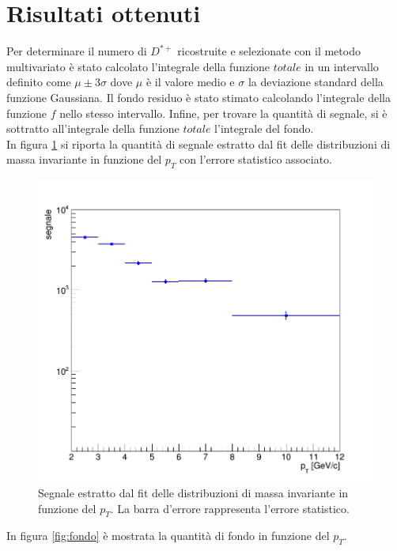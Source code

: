 \section{Risultati ottenuti}

Per determinare il numero di $D^{*+}$ ricostruite e selezionate con il metodo multivariato \`e stato calcolato l'integrale della funzione $totale$  in un intervallo definito come $\mu \pm 3 \sigma$ dove $\mu$  \`e il valore medio e $\sigma$ la deviazione standard della funzione Gaussiana. Il fondo residuo \`e stato stimato calcolando l'integrale della funzione $f$ nello stesso intervallo. Infine, per trovare la quantità di segnale, si è sottratto all'integrale della funzione $totale$ l'integrale del fondo. 
\\In figura \ref{fig:segnale} si riporta la quantità di segnale estratto dal fit delle distribuzioni di massa invariante in funzione del $p_T$ con l'errore statistico associato.

    \begin{figure}[htbp] 
        \centering
        \includegraphics[width=0.8\linewidth]{AnalisiDati/segnale.png}
        \caption{Segnale estratto dal fit delle distribuzioni di massa invariante in funzione del $p_T$. La barra d'errore rappresenta l'errore statistico.}
        \label{fig:segnale}
    \end{figure}


In figura \ref{fig:fondo} è mostrata la quantità di fondo in funzione del $p_T$.

